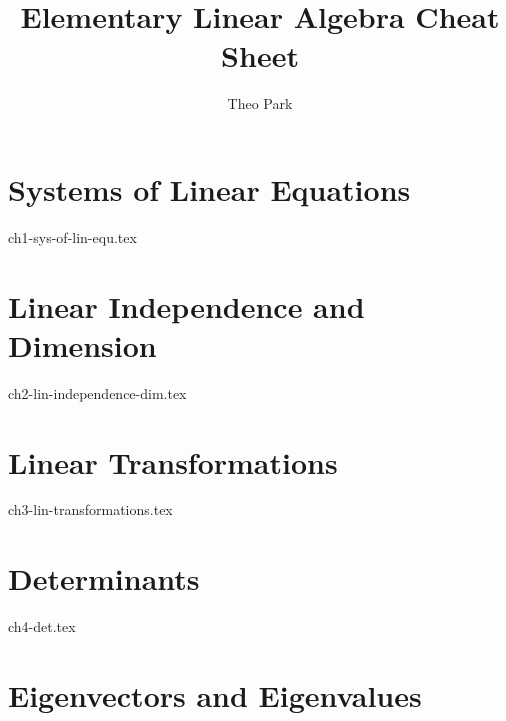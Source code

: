\documentclass{report}
\title{Elementary Linear Algebra Cheat Sheet}
\author{Theo Park}
\date{}
\begin{document}
\maketitle

\pagestyle{fancy}


\tableofcontents

\chapter{Systems of Linear Equations}
{ch1-sys-of-lin-equ.tex}

\chapter{Linear Independence and Dimension}
{ch2-lin-independence-dim.tex}

\chapter{Linear Transformations}
{ch3-lin-transformations.tex}

\chapter{Determinants}
{ch4-det.tex}

\chapter{Eigenvectors and Eigenvalues}
\end{document}
